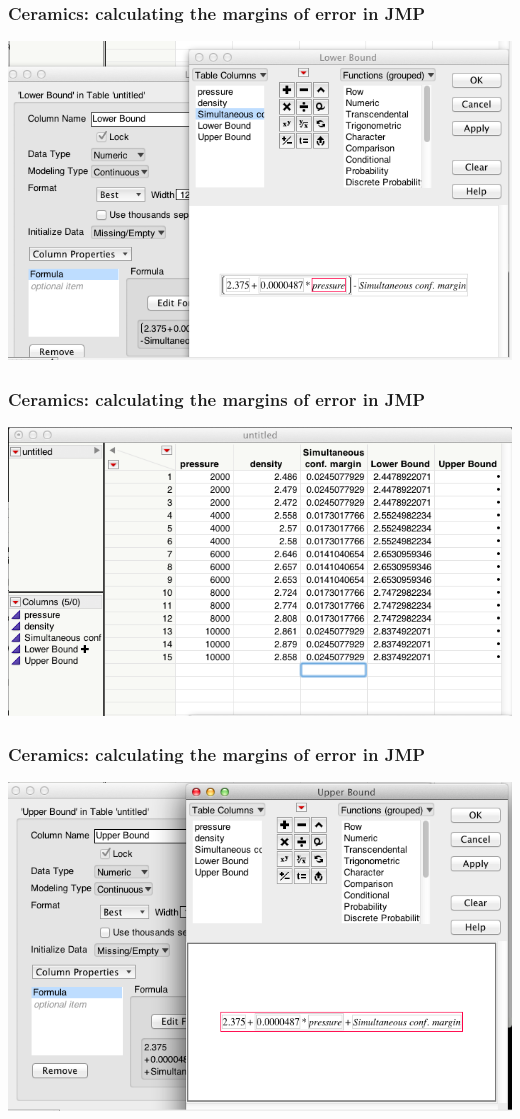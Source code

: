 \documentclass[handout]{beamer}\usepackage[]{graphicx}\usepackage[]{color}
\numberwithin{equation}{section}
\begin{document}
\begin{frame}
\frametitle{Ceramics: calculating the margins of error in JMP}
 \includegraphics{../../fig/simuljmp11.png}
\end{frame}

\begin{frame}
\frametitle{Ceramics: calculating the margins of error in JMP}
 \includegraphics{../../fig/simuljmp12.png}
\end{frame}

\begin{frame}
\frametitle{Ceramics: calculating the margins of error in JMP}
 \includegraphics{../../fig/simuljmp21.png}
\end{frame}
\end{document}
